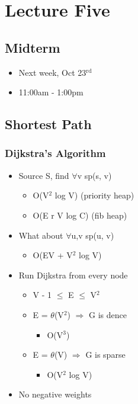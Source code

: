 \documentclass[11pt]{article}
\begin{document}
\section*{Lecture Five}
\label{sec:orgfd212fa}
\subsection*{Midterm}
\label{sec:org783bc03}
\begin{itemize}
\item Next week, Oct 23\(^{\text{rd}}\)
\item 11:00am - 1:00pm
\end{itemize}
\subsection*{Shortest Path}
\label{sec:orga7fd871}
\subsubsection*{Dijkstra's Algorithm}
\label{sec:orge26d1e2}
\begin{itemize}
\item Source S, find \(\forall\)v sp(s, v)
\begin{itemize}
\item O(V\(^{\text{2}}\) log V) (priority heap)
\item O(E r V log C) (fib heap)
\end{itemize}
\item What about \(\forall\)u,v sp(u, v)
\begin{itemize}
\item O(EV + V\(^{\text{2}}\) log V)
\end{itemize}
\item Run Dijkstra from every node
\begin{itemize}
\item V - 1 \(\le\) E \(\le\) V\(^{\text{2}}\)
\item E = \(\theta\)(V\(^{\text{2}}\)) \(\Rightarrow\) G is dence
\begin{itemize}
\item O(V\(^{\text{3}}\))
\end{itemize}
\item E = \(\theta\)(V) \(\Rightarrow\) G is sparse
\begin{itemize}
\item O(V\(^{\text{2}}\) log V)
\end{itemize}
\end{itemize}
\item No negative weights
\end{itemize}
\end{document}
